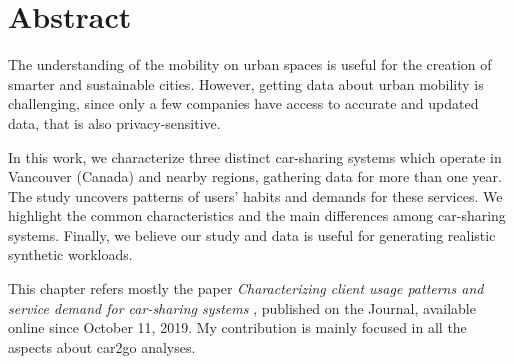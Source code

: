 \section{Abstract}
\label{sec:4_0_abstract}

The understanding of the mobility on urban spaces is useful for the creation of smarter and sustainable cities. However, getting data about urban mobility is challenging, since only a few companies have access to accurate and updated data, that is also privacy-sensitive. 

In this work, we characterize three distinct car-sharing systems which operate in Vancouver (Canada) and nearby regions, gathering data for more than one year. The study uncovers patterns of users' habits and demands for these services. 
We highlight the common characteristics and the main differences among car-sharing systems. Finally, we believe our study and data is useful for generating realistic synthetic workloads.

This chapter refers mostly the paper \textit{Characterizing client usage patterns and service demand for car-sharing systems} \cite{VancouverCS}, published on the Journal, available online since October 11, 2019. My contribution is mainly focused in all the aspects about car2go analyses. 

